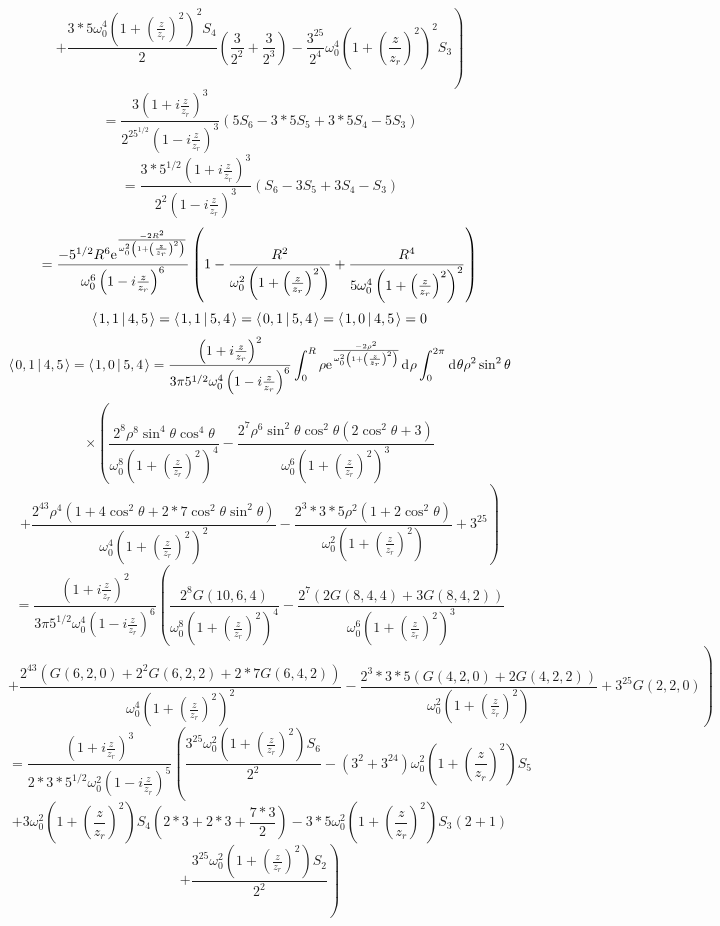 \documentclass[11pt]{amsart}
\makeatletter
\newcommand{\e}{{\rm e}}				%
\newcommand{\msp}[1]{\mspace{#1mu}}		%
\newcommand{\0}{\varnothing}		%
\newcommand{\dd}{\msp{1} {\rm{d}} \msp{1}}	%
\newcommand{\brac}[2]{\left\langle\msp{2} #1\left\lvert \msp{3.5} #2 \right.\right\rangle}	%
\newcommand{\1}{!}
\newcommand{\2}{@}
\newcommand{\3}{\#}
\newcommand{\4}{\$}
\newcommand{\5}{\%}
\newcommand{\6}{$^\wedge$}
\newcommand{\7}{\&}
\newcommand{\8}{*}
\newcommand{\9}{(}
\makeatother
\begin{document}
\[
\left.+\frac{3*5\omega_0^4\left(1+\left(\frac{z}{z_r}\right)^2\right)^2S_4}{2}\left(\frac{3}{2^2}+\frac{3}{2^3}\right)-\frac{3^25}{2^4}\omega_0^4\left(1+\left(\frac{z}{z_r}\right)^2\right)^2S_3\right)
\]
\[
=\frac{3\left(1+i\frac{z}{z_r}\right)^3}{2^25^{1/2}\left(1-i\frac{z}{z_r}\right)^3}\left(5S_6-3*5S_5+3*5S_4-5S_3\right)
\]
\[
=\frac{3*5^{1/2}\left(1+i\frac{z}{z_r}\right)^3}{2^2\left(1-i\frac{z}{z_r}\right)^3}\left(S_6-3S_5+3S_4-S_3\right)
\]
\[
=\frac{-5^{1/2}R^6\e^{\frac{-2R^2}{\omega_0^2\left(1+\left(\frac{z}{z_r}\right)^2\right)}}}{\omega_0^6\left(1-i\frac{z}{z_r}\right)^6}\left(1-\frac{R^2}{\omega_0^2\left(1+\left(\frac{z}{z_r}\right)^2\right)}+\frac{R^4}{5\omega_0^4\left(1+\left(\frac{z}{z_r}\right)^2\right)^2}\right)
\]
\[
\brac{1,1}{4,5} = \brac{1,1}{5,4} = \brac{0,1}{5,4} = \brac{1,0}{4,5} = 0
\]
\[
\brac{0,1}{4,5} = \brac{1,0}{5,4} = \frac{\left(1+i\frac{z}{z_r}\right)^2}{3\pi5^{1/2}\omega_0^4\left(1-i\frac{z}{z_r}\right)^6}\int_0^R\rho \e^{\frac{-2\rho^2}{\omega_0^2\left(1+\left(\frac{z}{z_r}\right)^2\right)}}\dd \rho \int_0^{2\pi}\dd \theta\rho^2\sin^2\theta
\]
\[
\times\left(\frac{2^8\rho^8\sin^4\theta\cos^4\theta}{\omega_0^8\left(1+\left(\frac{z}{z_r}\right)^2\right)^4}-\frac{2^7\rho^6\sin^2\theta\cos^2\theta\left(2\cos^2\theta+3\right)}{\omega_0^6\left(1+\left(\frac{z}{z_r}\right)^2\right)^3}
\right.
\]
\[
\left.+\frac{2^43\rho^4\left(1+4\cos^2\theta+2*7\cos^2\theta\sin^2\theta\right)}{\omega_0^4\left(1+\left(\frac{z}{z_r}\right)^2\right)^2}-\frac{2^3*3*5\rho^2\left(1+2\cos^2\theta\right)}{\omega_0^2\left(1+\left(\frac{z}{z_r}\right)^2\right)}+3^25\right)
\]
\[
=\frac{\left(1+i\frac{z}{z_r}\right)^2}{3\pi5^{1/2}\omega_0^4\left(1-i\frac{z}{z_r}\right)^6}\left(\frac{2^8G(10,6,4)}{\omega_0^8\left(1+\left(\frac{z}{z_r}\right)^2\right)^4}-\frac{2^7\left(2G(8,4,4)+3G(8,4,2)\right)}{\omega_0^6\left(1+\left(\frac{z}{z_r}\right)^2\right)^3}\right.
\]
\[
\left.+\frac{2^43\left(G(6,2,0)+2^2G(6,2,2)+2*7G(6,4,2)\right)}{\omega_0^4\left(1+\left(\frac{z}{z_r}\right)^2\right)^2}-\frac{2^3*3*5\left(G(4,2,0)+2G(4,2,2)\right)}{\omega_0^2\left(1+\left(\frac{z}{z_r}\right)^2\right)}+3^25G(2,2,0)\right)
\]
\[
=\frac{\left(1+i\frac{z}{z_r}\right)^3}{2*3*5^{1/2}\omega_0^2\left(1-i\frac{z}{z_r}\right)^5}\left(\frac{3^25\omega_0^2\left(1+\left(\frac{z}{z_r}\right)^2\right)S_6}{2^2}-\left(3^2+3^24\right)\omega_0^2\left(1+\left(\frac{z}{z_r}\right)^2\right)S_5
\right.
\]
\[
\left.+3\omega_0^2\left(1+\left(\frac{z}{z_r}\right)^2\right)S_4\left(2*3+2*3+\frac{7*3}{2}\right)-3*5\omega_0^2\left(1+\left(\frac{z}{z_r}\right)^2\right)S_3\left(2+1\right)\right.
\]
\[
\left.+\frac{3^25\omega_0^2\left(1+\left(\frac{z}{z_r}\right)^2\right)S_2}{2^2}\right)
\]
\end{document}
